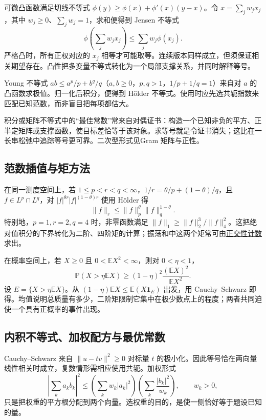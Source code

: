 \documentclass[12pt,fontset=fandol]{ctexart}
\begin{document}
\label{app:estimate-convexity}

可微凸函数满足切线不等式 $\phi(y)\geq\phi(x)+\phi'(x)(y-x)$。令 $x=\sum_jw_jx_j$，其中 $w_j\geq0$、$\sum_jw_j=1$，求和便得到 Jensen 不等式
\[
\phi\!\left(\sum_jw_jx_j\right)\leq\sum_jw_j\phi(x_j).
\]
严格凸时，所有正权对应的 $x_j$ 相等才可能取等。连续版本同样成立，但须保证相关期望存在。凸性把多变量不等式转化为一个局部支撑关系，并同时解释等号。

Young 不等式 $ab\leq a^p/p+b^q/q$（$a,b\geq0$，$p,q>1$，$1/p+1/q=1$）来自对 $a$ 的凸函数求极值。归一化后积分，便得到 Hölder 不等式。使用时应先选共轭指数来匹配已知范数，而非盲目把每项都估大。

积分或矩阵不等式中的“最佳常数”常来自对偶证书：构造一个已知非负的平方、正半定矩阵或支撑函数，使目标差恰等于该对象。求等号就是令证书消失；这比在一长串松弛中追踪等号更可靠。二次型形式见Gram 矩阵与正性。

\subsection{范数插值与矩方法}

\label{app:estimate-moments}

在同一测度空间上，若 $1\leq p<r<q<\infty$，$1/r=\theta/p+(1-\theta)/q$，且 $f\in L^p\cap L^q$，对 $|f|^{\theta r}|f|^{(1-\theta)r}$ 使用 Hölder 得
\[
\|f\|_r\leq\|f\|_p^\theta\|f\|_q^{1-\theta}.
\]
特别地，$p=1,r=2,q=4$ 时，非零函数满足 $\|f\|_1\geq\|f\|_2^3/\|f\|_4^2$。这把绝对值积分的下界转化为二阶、四阶矩的计算；振荡和中这两个矩常可由\hyperref[app:integration-fourier]{正交性计数}求出。

在概率空间上，若 $X\geq0$ 且 $0<\mathbb EX^2<\infty$，则对 $0<\eta<1$，
\[
\mathbb P(X>\eta\mathbb EX)\geq(1-\eta)^2\frac{(\mathbb EX)^2}{\mathbb EX^2}.
\]
设 $E=\{X>\eta\mathbb EX\}$。从 $(1-\eta)\mathbb EX\leq\mathbb E(X\mathbf1_E)$ 出发，用 Cauchy--Schwarz 即得。均值说明总质量有多少，二阶矩限制它集中在极少数点上的程度；两者共同迫使一个具有正概率的事件出现。

\subsection{内积不等式、加权配方与最优常数}

\label{app:inequality-cauchy}

Cauchy--Schwarz 来自 $\|u-tv\|^2\geq0$ 对标量 $t$ 的极小化。因此等号恰在两向量线性相关时成立，复数情形需相应使用共轭。加权形式
\[
\left|\sum_ka_kb_k\right|^2
\leq\left(\sum_kw_k|a_k|^2\right)
\left(\sum_k\frac{|b_k|^2}{w_k}\right),\qquad w_k>0,
\]
只是把权重的平方根分配到两个向量。选权重的目的，是使一侧恰好等于题设已知的量。
\end{document}

